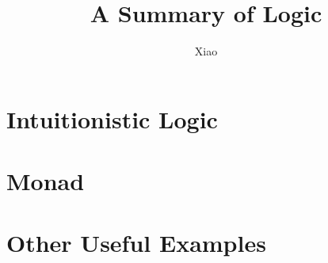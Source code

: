 \documentclass[12pt,a4paper]{report}
\theoremstyle{definition}
\theoremstyle{plain}
\theoremstyle{remark}
\begin{document}
\title{A Summary of Logic}
\author{Xiao}
\date{}
\maketitle

\tableofcontents





\chapter{Intuitionistic Logic}
\label{intuitionistic-logic}

\chapter{Monad}
\label{monad}

\chapter{Other Useful Examples}
\label{monad-examples}



\end{document}
